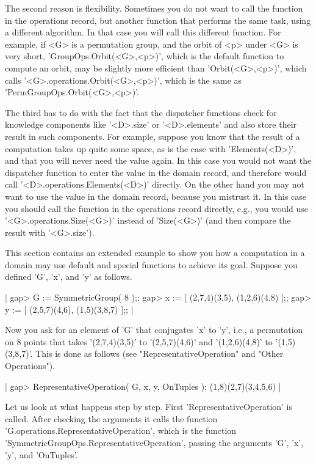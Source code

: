 The second reason is flexibility.  Sometimes you do not want to call  the
function in the operations record, but another function that performs the
same task, using a different algorithm.  In that case you will  call this
different function.  For example, if <G> is a permutation group,  and the
orbit of <p> under <G> is very short, 'GroupOps.Orbit(<G>,<p>)', which is
the  default function to compute an orbit, may be slightly more efficient
than 'Orbit(<G>,<p>)', which calls '<G>.operations.Orbit(<G>,<p>)', which
is the same as 'PermGroupOps.Orbit(<G>,<p>)'.

The third has to do with the fact that the dispatcher functions check for
knowledge   components like '<D>.size' or   '<D>.elements' and also store
their result in such components.  For example,  suppose you know that the
result of a computation takes  up quite some space, as  is the case  with
'Elements(<D>)', and that  you will never  need the value again.  In this
case you would not want the dispatcher function to enter the value in the
domain  record, and therefore  would call  '<D>.operations.Elements(<D>)'
directly.  On  the other hand you  may not want  to use the  value in the
domain record, because you mistrust it.  In this case you should call the
function  in   the operations   record   directly,  e.g., you would   use
'<G>.operations.Size(<G>)' instead of  'Size(<G>)' (and  then compare the
result with '<G>.size').


This section contains an extended example to  show  you how a computation
in a domain may  use default and special  functions to achieve its  goal.
Suppose you defined 'G', 'x', and 'y' as follows.

|    gap> G := SymmetricGroup( 8 );;
    gap> x := [ (2,7,4)(3,5), (1,2,6)(4,8) ];;
    gap> y := [ (2,5,7)(4,6), (1,5)(3,8,7) ];; |

Now you ask for  an  element of 'G' that   conjugates 'x' to 'y', i.e., a
permutation on 8 points  that takes '(2,7,4)(3,5)' to '(2,5,7)(4,6)'  and
'(1,2,6)(4,8)' to  '(1,5)(3,8,7)'.      This is done    as follows   (see
"RepresentativeOperation" and "Other Operations").

|    gap> RepresentativeOperation( G, x, y, OnTuples );
    (1,8)(2,7)(3,4,5,6) |

Let    us    look    at    what    happens    step   by    step.    First
'RepresentativeOperation'  is called.  After  checking  the  arguments it
calls the  function 'G.operations.RepresentativeOperation', which  is the
function    'SymmetricGroupOps.RepresentativeOperation',   passing    the
arguments 'G', 'x', 'y', and 'OnTuples'.

